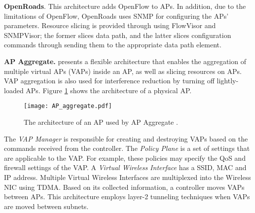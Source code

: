 \textbf{OpenRoads}. This architecture \cite{Blueprints,yap2010openroads} adds OpenFlow to APs.
In addition, due to the limitations of OpenFlow, OpenRoads uses SNMP for configuring the APs' parameters.
Resource slicing is provided through using FlowVisor and SNMPVisor; the former slices data path, and the latter slices configuration commands through sending them to the appropriate data path element.




\textbf{AP Aggregate.}
\label{ap_aggregate}
\cite{nagai2011framework} presents a flexible architecture that enables the aggregation of multiple virtual APs (VAPs) inside an AP, as well as slicing resources on APs.
VAP aggregation is also used for interference reduction by turning off lightly-loaded APs. 
Figure \ref{fig_ap_aggregate} shows the architecture of a physical AP.
%
\begin{figure}[!t]
	\centering
	\texttt{[image: AP\_aggregate.pdf]}
	\caption{The architecture of an AP used by AP Aggregate \cite{nagai2011framework}. }
	\label{fig_ap_aggregate}
\end{figure}
%
The \textit{VAP Manager} is responsible for creating and destroying VAPs based on the commands received from the controller.
The \textit{Policy Plane} is a set of settings that are applicable to the VAP.
For example, these policies may specify the QoS and firewall settings of the VAP.
A \textit{Virtual Wireless Interface} has a SSID, MAC and IP address.
Multiple Virtual Wireless Interfaces are multiplexed into the Wireless NIC using TDMA.
Based on its collected information, a controller moves VAPs between APs.
This architecture employs layer-2 tunneling techniques when VAPs are moved between subnets.



